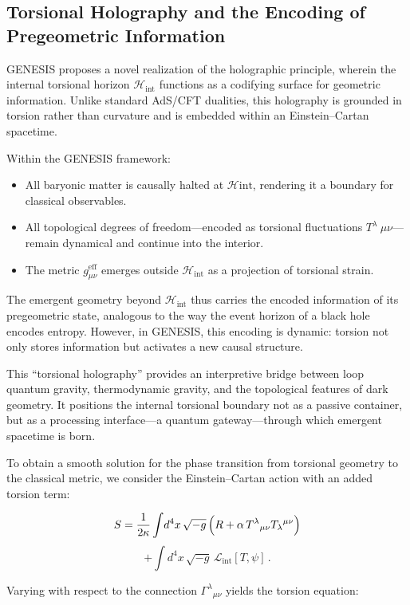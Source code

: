 \documentclass{article}
\begin{document}
\subsection{Torsional Holography and the Encoding of Pregeometric Information} GENESIS proposes a novel realization of the holographic principle, wherein the internal torsional horizon $\mathcal{H}_{\text{int}}$ functions as a codifying surface for geometric information. Unlike standard AdS/CFT dualities, this holography is grounded in torsion rather than curvature and is embedded within an Einstein--Cartan spacetime.

Within the GENESIS framework: \begin{itemize} \item All baryonic matter is causally halted at $\mathcal{H}{\text{int}}$, rendering it a boundary for classical observables. \item All topological degrees of freedom---encoded as torsional fluctuations $T^{\lambda}{\ \mu\nu}$---remain dynamical and continue into the interior. \item The metric $g_{\mu\nu}^{\text{eff}}$ emerges outside $\mathcal{H}_{\text{int}}$ as a projection of torsional strain. \end{itemize}

The emergent geometry beyond $\mathcal{H}_{\text{int}}$ thus carries the encoded information of its pregeometric state, analogous to the way the event horizon of a black hole encodes entropy. However, in GENESIS, this encoding is dynamic: torsion not only stores information but activates a new causal structure.

This ``torsional holography'' provides an interpretive bridge between loop quantum gravity, thermodynamic gravity, and the topological features of dark geometry. It positions the internal torsional boundary not as a passive container, but as a processing interface---a quantum gateway---through which emergent spacetime is born.

To obtain a smooth solution for the phase transition from torsional geometry to the classical metric, we consider the Einstein–Cartan action with an added torsion term:

\[
S = \frac{1}{2\kappa}\int \! d^4x\,\sqrt{-g}\,\Bigl(R + \alpha\,T^{\lambda}{}_{\mu\nu}T_{\lambda}{}^{\mu\nu}\Bigr)
\]
\[ 
+ \int \! d^4x\,\sqrt{-g}\,\mathcal{L}_{\text{int}}[T,\psi]\,. 
\]

Varying with respect to the connection $\Gamma^\lambda{}_{\mu\nu}$ yields the torsion equation:
\end{document}
